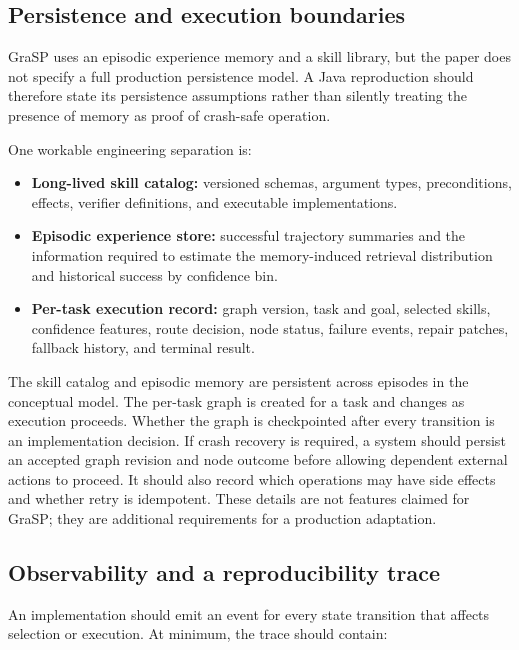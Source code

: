 \subsection{Persistence and execution boundaries}

GraSP uses an episodic experience memory and a skill library, but the paper does not specify a full production persistence model. A Java reproduction should therefore state its persistence assumptions rather than silently treating the presence of memory as proof of crash-safe operation.

One workable engineering separation is:

\begin{itemize}
  \item \textbf{Long-lived skill catalog:} versioned schemas, argument types, preconditions, effects, verifier definitions, and executable implementations.
  \item \textbf{Episodic experience store:} successful trajectory summaries and the information required to estimate the memory-induced retrieval distribution and historical success by confidence bin.
  \item \textbf{Per-task execution record:} graph version, task and goal, selected skills, confidence features, route decision, node status, failure events, repair patches, fallback history, and terminal result.
\end{itemize}

The skill catalog and episodic memory are persistent across episodes in the conceptual model. The per-task graph is created for a task and changes as execution proceeds. Whether the graph is checkpointed after every transition is an implementation decision. If crash recovery is required, a system should persist an accepted graph revision and node outcome before allowing dependent external actions to proceed. It should also record which operations may have side effects and whether retry is idempotent. These details are not features claimed for GraSP; they are additional requirements for a production adaptation.

\subsection{Observability and a reproducibility trace}

An implementation should emit an event for every state transition that affects selection or execution. At minimum, the trace should contain:

